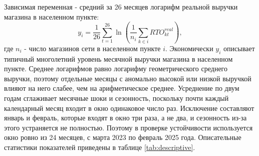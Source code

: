 \documentclass[12pt, a4paper]{article}
\begin{document}
Зависимая переменная - средний за 26 месяцев логарифм реальной выручки магазина в населенном
пункте:
\[
y_i = \frac{1}{26} \sum_{t=1}^{26} \ln \left( \frac{1}{n_i} \sum_{k \in i} RTO^{real}_{kt} \right),
\]
где $n_i$ - число магазинов сети в населенном пункте $i$. Экономически $y_i$ описывает типичный
многолетний уровень месячной выручки магазина в населенном пункте. Среднее логарифмов равно
логарифму геометрического среднего выручки, поэтому отдельные месяцы с аномально высокой или
низкой выручкой влияют на него слабее, чем на арифметическое среднее. Усреднение по двум годам
сглаживает месячные шоки и сезонность, поскольку почти каждый календарный месяц входит в окно
одинаковое число раз. Исключение составляют январь и февраль, которые входят в окно три раза, а не
два, и сезонность из-за этого устраняется не полностью. Поэтому в проверке устойчивости
используется окно ровно из 24 месяцев, с марта 2023 по февраль 2025 года. Описательные
статистики показателей приведены в таблице \ref{tab:descriptive}.
\end{document}
